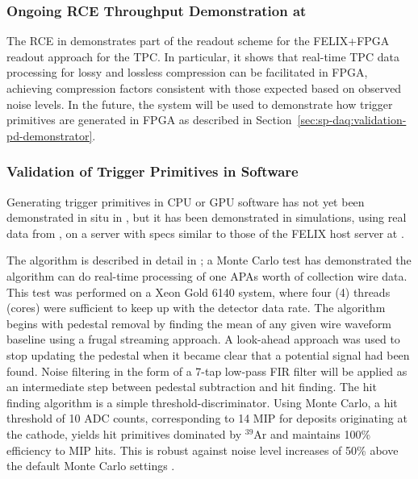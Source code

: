\subsubsection{Ongoing RCE Throughput Demonstration at }
\label{sec:sp-daq:validation-pdune-rce}

The RCE  in  demonstrates part of the readout scheme for
the FELIX+FPGA readout approach for the TPC. In particular, it
shows that real-time TPC data processing for lossy
and lossless compression can be facilitated in FPGA, achieving
compression factors consistent with those expected based on observed
 noise levels. In the future, the system will be used
to demonstrate how trigger primitives are generated in FPGA as
described in Section~\ref{sec:sp-daq:validation-pd-demonstrator}.

\subsubsection{Validation of Trigger Primitives in Software}
\label{sec:sp-daq:validation-software-trigger-primitives}

Generating trigger primitives in CPU or GPU software has not
yet been demonstrated in situ  in , but it has been
demonstrated in simulations, using real data from , on a
server with specs similar to those 
of the FELIX host server at .

The algorithm is described in detail in \cite{docid-11236}; a Monte Carlo test has demonstrated the algorithm can do real-time processing of one APAs worth
of collection wire data. This test was performed on a Xeon Gold 6140
system, where four (4) threads (cores) were sufficient to keep
up with the detector data rate. The algorithm begins with pedestal removal by
finding the mean of any given wire waveform baseline using a frugal
streaming approach. A look-ahead approach was used to stop
updating the pedestal when it became clear that a potential signal
had been found. Noise filtering in the form of a 7-tap low-pass FIR
filter will be applied as an intermediate step
between pedestal subtraction and hit finding. The hit finding
algorithm is a simple threshold-discriminator. Using Monte Carlo, a hit
threshold of 10 ADC counts, corresponding to 1\/4 MIP for deposits originating at the cathode, yields hit primitives dominated by
$^39$Ar and maintains 100\% efficiency to MIP hits. This is robust against noise level 
increases of 50\% above the default  Monte Carlo settings \cite{docid-11275}. 

